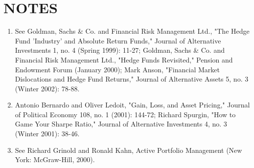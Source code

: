 \documentclass[11pt]{article}
\begin{document}
\section*{NOTES}
\begin{enumerate}
  \item See Goldman, Sachs \& Co. and Financial Risk Management Ltd., "The Hedge Fund 'Industry' and Absolute Return Funds," Journal of Alternative Investments 1, no. 4 (Spring 1999): 11-27; Goldman, Sachs \& Co. and Financial Risk Management Ltd., "Hedge Funds Revisited," Pension and Endowment Forum (January 2000); Mark Anson, "Financial Market Dislocations and Hedge Fund Returns," Journal of Alternative Assets 5, no. 3 (Winter 2002): 78-88.

  \item Antonio Bernardo and Oliver Ledoit, "Gain, Loss, and Asset Pricing," Journal of Political Economy 108, no. 1 (2001): 144-72; Richard Spurgin, "How to Game Your Sharpe Ratio," Journal of Alternative Investments 4, no. 3 (Winter 2001): 38-46.

  \item See Richard Grinold and Ronald Kahn, Active Portfolio Management (New York: McGraw-Hill, 2000).

\end{enumerate}
\end{document}
